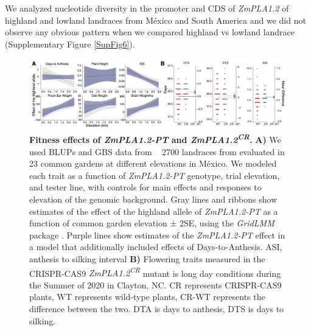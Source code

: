 \documentclass[9pt,twocolumn,twoside,lineno]{BioRxiv}
\begin{document}
We analyzed nucleotide diversity in the promoter and CDS of \textit{ZmPLA1.2} of highland and lowland landraces from México and South America and we did not observe any obvious pattern  when we compared highland vs lowland landrace (Supplementary Figure \ref{SupFig6}).

\begin{figure}[!ht]
\begin{center}
\includegraphics[width=0.8\paperwidth]{Figures/Fig_4.png}
\caption{\textbf{Fitness effects of \textit{ZmPLA1.2-PT} and \textit{ZmPLA1.2\textsuperscript{CR}}.} 
\textbf{A)} We used BLUPs and GBS data from ~ 2700 landraces from \cite{Gates2019-xu} evaluated in 23 common gardens at different elevations in México. 
We modeled each trait as a function of \textit{ZmPLA1.2-PT} genotype, trial elevation, and tester line, with controls for main effects and responses to elevation of the genomic background. 
Gray lines and ribbons show estimates of the effect of the highland allele of \textit{ZmPLA1.2-PT} as a function of common garden elevation ± 2SE, using the \textit{GridLMM} package \cite{Runcie2019-Gr}. 
Purple lines show estimates of the \textit{ZmPLA1.2-PT} effect in a model that additionally included effects of Days-to-Anthesis. ASI, anthesis to silking interval
\textbf{B)} Flowering traits measured in the CRISPR-CAS9 \textit{ZmPLA1.2\textsuperscript{CR}} mutant is long day conditions during the Summer of 2020 in Clayton, NC. 
CR represents CRISPR-CAS9 plants, WT represents wild-type plants, CR-WT represents the difference between the two. DTA is days to anthesis, DTS is days to silking.} 
\label{Fig4}
\end{center}
\end{figure}
\end{document}
